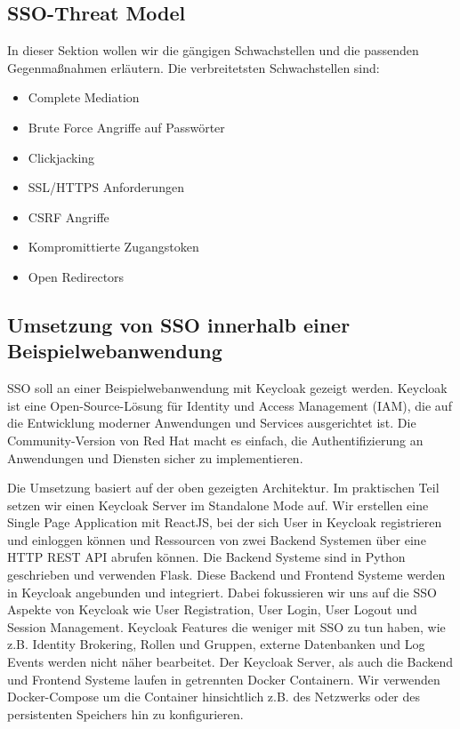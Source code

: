 \documentclass[12pt]{article}
\begin{document}
\subsection{SSO-Threat Model}
In dieser Sektion wollen wir die gängigen Schwachstellen und die passenden Gegenmaßnahmen erläutern.
Die verbreitetsten Schwachstellen sind:

\begin{itemize}
	\item Complete Mediation \cite{RFC6819}
		
	\item Brute Force Angriffe auf Passwörter \cite{RFC6819}
		
	\item Clickjacking \cite{RFC6819}
	
	\item SSL/HTTPS Anforderungen \cite{RFC6819}
	
	\item CSRF Angriffe \cite{RFC6819}
	
	\item Kompromittierte Zugangstoken \cite{RFC6819}
	
	\item Open Redirectors \cite{RFC6819}
\end{itemize}

\subsection{Umsetzung von SSO innerhalb einer Beispielwebanwendung}
SSO soll an einer Beispielwebanwendung mit Keycloak gezeigt werden. Keycloak ist eine Open-Source-Lösung für Identity und Access Management (IAM), die auf die Entwicklung moderner Anwendungen und Services ausgerichtet ist. Die Community-Version von Red Hat macht es einfach, die Authentifizierung an Anwendungen und Diensten sicher zu implementieren.

Die Umsetzung basiert auf der oben gezeigten Architektur. Im praktischen Teil setzen wir einen Keycloak Server im Standalone Mode auf. Wir erstellen eine Single Page Application mit ReactJS, bei der sich User in Keycloak registrieren und einloggen können und Ressourcen von zwei Backend Systemen über eine HTTP REST API abrufen können. Die Backend Systeme sind in Python geschrieben und verwenden Flask. Diese Backend und Frontend Systeme werden in Keycloak angebunden und integriert. Dabei fokussieren wir uns auf die SSO Aspekte von Keycloak wie User Registration, User Login, User Logout und Session Management. Keycloak Features die weniger mit SSO zu tun haben, wie z.B. Identity Brokering, Rollen und Gruppen, externe Datenbanken und Log Events werden nicht näher bearbeitet. Der Keycloak Server, als auch die Backend und Frontend Systeme laufen in getrennten Docker Containern. Wir verwenden Docker-Compose um die Container hinsichtlich z.B. des Netzwerks oder des persistenten Speichers hin zu konfigurieren.
\end{document}
